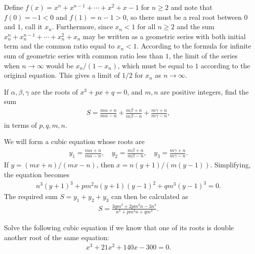 \begin{solution}
    Define $f(x) = x^{n} + x^{n-1} + \cdots + x^2 + x - 1$ for $n\geq 2$ and note that $f(0)=-1<0$ and $f(1)=n-1>0$, so there must be a real root between $0$ and $1$, call it $x_n$. Furthermore, since $x_n<1$ for all $n\geq 2$ and the sum $x_n^{n} + x_n^{n-1} + \cdots + x_n^2 + x_n$ may be written as a geometric series with both initial term and the common ratio equal to $x_n<1$. According to the formula for infinite sum of geometric series with common ratio less than $1$, the limit of the series when $n\to \infty$ would be $x_n/(1-x_n)$, which must be equal to $1$ according to the original equation. This gives a limit of $1/2$ for $x_n$ as $n\to\infty$.
\end{solution}


\begin{question}
    If $\alpha, \beta, \gamma$ are the roots of $x^3+px+q=0$, and $m,n$ are positive integers, find the sum
    \begin{align*}
        S = \frac{m\alpha + n}{m\alpha-n} + \frac{m\beta + n}{m\beta-n} + \frac{m\gamma + n}{m\gamma-n},
    \end{align*}
    in terms of $p,q,m,n$.
\end{question}


\begin{solution}
    We will form a cubic equation whose roots are
    \begin{align*}
        y_1 = \frac{m\alpha + n}{m\alpha-n} ,\quad y_2= \frac{m\beta + n}{m\beta-n}, \quad y_3= \frac{m\gamma + n}{m\gamma-n}.
    \end{align*}
    If $y=(mx+n)/(mx-n)$, then $x=n(y+1)/(m(y-1))$. Simplifying, the equation becomes
    \begin{align*}
        n^3(y+1)^3 + pm^2n(y+1)(y-1)^2 + qm^3(y-1)^3=0.
    \end{align*}
    The required sum $S=y_1+y_2+y_3$ can then be calculated as
    \begin{align*}
        S = \frac{3qm^3+2pm^2n-3n^3}{n^3+pm^2n+qm^3}.
    \end{align*}
\end{solution}


\begin{question}
    Solve the following cubic equation if we know that one of its roots is double another root of the same equation:
    \begin{align*}
        x^3+21x^2+140x-300=0.
    \end{align*}
\end{question}

